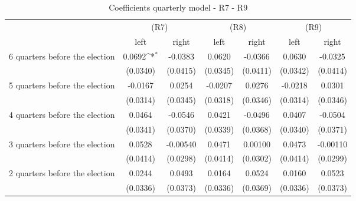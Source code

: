 \begin{table}[!ht]\centering \scriptsize
\def\sym#1{\ifmmode^{#1}\else\(^{#1}\)\fi}
\caption{Coefficients quarterly model - R7 - R9}
\begin{tabular}{l*{6}{c}}
\hline\hline
                    &\multicolumn{2}{c}{(R7)}&\multicolumn{2}{c}{(R8)}&\multicolumn{2}{c}{(R9)}\\
                    &\multicolumn{1}{c}{left}&\multicolumn{1}{c}{right}&\multicolumn{1}{c}{left}&\multicolumn{1}{c}{right}&\multicolumn{1}{c}{left}&\multicolumn{1}{c}{right}\\
\hline
 6 quarters before the election&      0.0692\sym{*}  &     -0.0383         &      0.0620         &     -0.0366         &      0.0630         &     -0.0325         \\
                    &    (0.0340)         &    (0.0415)         &    (0.0345)         &    (0.0411)         &    (0.0342)         &    (0.0414)         \\
[0,12em]
 5 quarters before the election&     -0.0167         &      0.0254         &     -0.0207         &      0.0276         &     -0.0218         &      0.0301         \\
                    &    (0.0314)         &    (0.0345)         &    (0.0318)         &    (0.0346)         &    (0.0314)         &    (0.0346)         \\
[0,12em]
 4 quarters before the election&      0.0464         &     -0.0546         &      0.0421         &     -0.0496         &      0.0407         &     -0.0504         \\
                    &    (0.0341)         &    (0.0370)         &    (0.0339)         &    (0.0368)         &    (0.0340)         &    (0.0371)         \\
[0,12em]
 3 quarters before the election&      0.0528         &    -0.00540         &      0.0471         &     0.00100         &      0.0473         &    -0.00110         \\
                    &    (0.0414)         &    (0.0298)         &    (0.0414)         &    (0.0302)         &    (0.0414)         &    (0.0299)         \\
[0,12em]
 2 quarters before the election&      0.0244         &      0.0493         &      0.0164         &      0.0524         &      0.0160         &      0.0523         \\
                    &    (0.0336)         &    (0.0373)         &    (0.0336)         &    (0.0369)         &    (0.0336)         &    (0.0373)         \\

\end{tabular}
\end{table}
